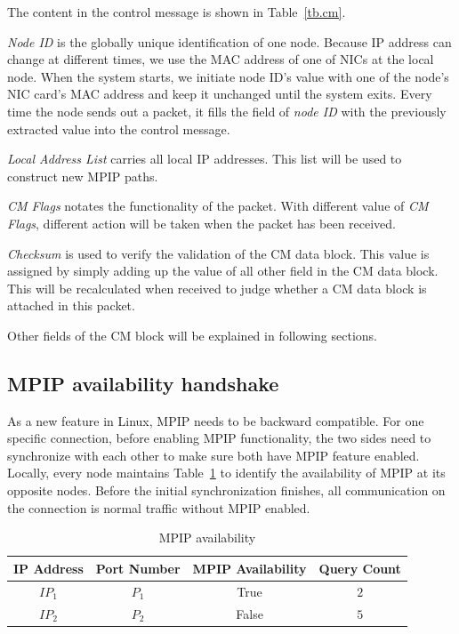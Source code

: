 The content in the control message is shown in Table~\ref{tb.cm}.

\emph{Node ID} is the globally unique identification of one node. Because IP address can change at different times, we use the MAC address of one of NICs at the local node. When the system starts, we initiate node ID's value with one of the node's NIC card's MAC address and keep it unchanged until the system exits. Every time the node sends out a packet, it fills the field of \emph{node ID} with the previously extracted value into the control message.

\emph{Local Address List} carries all local IP addresses. This list will be used to construct new MPIP paths.

\emph{CM Flags} notates the functionality of the packet. With different value of \emph{CM Flags}, different action will be taken when the packet has been received. 

\emph{Checksum} is used to verify the validation of the CM data block. This value is assigned by simply adding up the value of all other field in the CM data block. This will be recalculated when received to judge whether a CM data block is attached in this packet.

Other fields of the CM block will be explained in following sections.

\subsection{MPIP availability handshake}

As a new feature in Linux, MPIP needs to be backward compatible. For one specific connection, before enabling MPIP functionality, the two sides need to synchronize with each other to make sure both have MPIP feature enabled. Locally, every node maintains Table~\ref{tb.me} to identify the availability of MPIP at its opposite nodes. Before the initial synchronization finishes, all communication on the connection is normal traffic without MPIP enabled.

\begin{table}[htbp]
\caption{\label{tb.me}MPIP availability}
\centering
\begin{tabular}{|c|c|c|c|}
\hline
IP Address & Port Number & MPIP Availability & Query Count\\
\hline
${IP}_{1}$ & ${P}_{1}$ & True  & $2$ \\
\hline
${IP}_{2}$ & ${P}_{2}$ & False & $5$ \\
\hline
\end{tabular}
\end{table}


